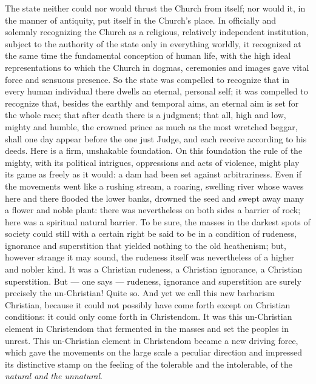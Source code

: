 \documentclass[12pt,a4paper,openany]{book}
\newcommand{\opage}[1]{\marginnote{\footnotesize\textit{[#1]}}}
\begin{document}
The state neither could nor would thrust the Church from itself; nor
would it, in the manner of antiquity, put itself in the Church's place.
In officially and solemnly recognizing the Church as
a religious, relatively independent institution, subject to the authority of the state only in
everything worldly, it recognized
at the same time the fundamental conception of human life,
with the high ideal representations to which the Church in dogmas,
ceremonies and images gave vital force and sensuous
presence. So the state was compelled to recognize
that in every human individual there dwells an eternal, personal
self; it was compelled to recognize that, besides the
earthly and temporal aims, an
eternal aim is set for the whole race; that after death there is a judgment; that all,
high and low, mighty and humble, the crowned prince
as much as the most wretched beggar, shall one day appear before the one
just Judge, and each receive according to his deeds.
Here is a firm, unshakable foundation. On this foundation
the rule of the mighty, with its political intrigues,
oppressions and acts of violence, might play its game as freely
as it would: a dam had been set against arbitrariness.
Even if the movements went like a rushing stream, a roaring,
swelling river whose waves here and there flooded
the lower banks, drowned the seed and swept away many a
flower and noble plant: there was nevertheless
on both sides a barrier of rock; here was a spiritual
natural barrier. To be sure, the masses in the darkest
spots of society could still with a certain right be said to be in
a condition of rudeness, ignorance and superstition
that yielded nothing to the old heathenism; but,
\setcounter{footnote}{0}%
\opage{307}however strange it may sound, the rudeness
itself was nevertheless of a higher and nobler kind. It was a Christian
rudeness, a Christian ignorance, a Christian superstition. But
--- one says --- rudeness, ignorance and superstition are surely
precisely the un-Christian! Quite so. And yet we call
this new barbarism Christian, because it could not possibly
have come forth except on Christian conditions: it could
only come forth in Christendom. It was this un-Christian element
in Christendom that fermented in the masses and set
the peoples in unrest. This un-Christian element in Christendom became a
new driving force, which gave the movements on the large scale a peculiar
direction and impressed its distinctive stamp on the feeling of the tolerable and the intolerable,
of the \emph{natural and the unnatural}.
\end{document}
